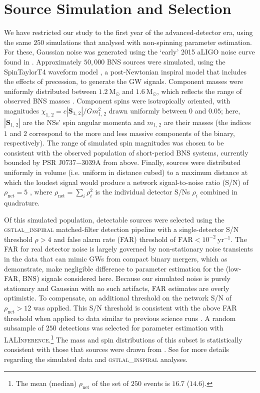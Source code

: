 \section{Source Simulation and Selection}\label{sec:sources}

We have restricted our study to the first year of the advanced-detector era, using the same $250$ simulations that \citet{Singer_2014} analysed with non-spinning parameter estimation. For these, Gaussian noise was generated using the `early' 2015 aLIGO noise curve found in \citet{Barsotti:2012}. Approximately $50,000$ BNS sources were simulated, using the SpinTaylorT4 waveform model \citep{Buonanno_2003,Buonanno_2009}, a post-Newtonian inspiral model that includes the effects of precession, to generate the GW signals. Component masses were uniformly distributed between $1.2~\mathrm{M}_\odot$ and $1.6~\mathrm{M}_\odot$, which reflects the range of observed BNS masses \citep{_zel_2012}. Component spins were isotropically oriented, with magnitudes $\chi_{1,\,2} = c |\boldsymbol{S}_{1,\,2}|/G m_{1,\,2}^2$ drawn uniformly between $0$ and $0.05$; here, $|\boldsymbol{S}_{1,\,2}|$ are the NSs' spin angular momenta and $m_{1,\,2}$ are their masses (the indices $1$ and $2$ correspond to the more and less massive components of the binary, respectively).  The range of simulated spin magnitudes was chosen to be consistent with the observed population of short-period BNS systems, currently bounded by PSR J0737$-$3039A \citep{Burgay_2003,Brown_2012} from above.  Finally, sources were distributed uniformly in volume (i.e. uniform in distance cubed) to a maximum distance at which the loudest signal would produce a network signal-to-noise ratio (S/N) of $\rho_\mathrm{net} = 5$ \citep{Singer_2014}, where $\rho_\mathrm{net} = \sum_i \rho_i^2$ is the individual detector S/Ns $\rho_i$ combined in quadrature.

Of this simulated population, detectable sources were selected using the \textsc{gstlal\_inspiral} matched-filter detection pipeline \citep{Cannon_2012} with a single-detector S/N threshold $\rho>4$ and false alarm rate (FAR) threshold of $\mathrm{FAR}<10^{-2}~\mathrm{yr}^{-1}$.  The FAR for real detector noise is largely governed by non-stationary noise transients in the data that can mimic GWs from compact binary mergers, which as \citet{Berry_2014} demonstrate, make negligible difference to parameter estimation for the (low-FAR, BNS) signals considered here.  Because our simulated noise is purely stationary and Gaussian with no such artifacts, FAR estimates are overly optimistic. To compensate, an additional threshold on the network S/N of $\rho_\mathrm{net} > 12$ was applied. This S/N threshold is consistent with the above FAR threshold when applied to data similar to previous science runs \citep{2013arXiv1304.0670L,Berry_2014}. A random subsample of $250$ detections was selected for parameter estimation with \textsc{LALInference}.\footnote{The mean (median) $\rho_\mathrm{net}$ of the set of $250$ events is $16.7$ ($14.6$).} The mass and spin distributions of this subset is statistically consistent with those that sources were drawn from \citep{Berry_2014}. See \citet{Singer_2014} for more details regarding the simulated data and \textsc{gstlal\_inspiral} analyses.
  